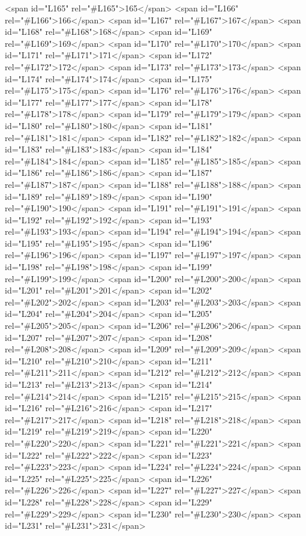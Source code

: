 <span id="L165" rel="#L165">165</span>
<span id="L166" rel="#L166">166</span>
<span id="L167" rel="#L167">167</span>
<span id="L168" rel="#L168">168</span>
<span id="L169" rel="#L169">169</span>
<span id="L170" rel="#L170">170</span>
<span id="L171" rel="#L171">171</span>
<span id="L172" rel="#L172">172</span>
<span id="L173" rel="#L173">173</span>
<span id="L174" rel="#L174">174</span>
<span id="L175" rel="#L175">175</span>
<span id="L176" rel="#L176">176</span>
<span id="L177" rel="#L177">177</span>
<span id="L178" rel="#L178">178</span>
<span id="L179" rel="#L179">179</span>
<span id="L180" rel="#L180">180</span>
<span id="L181" rel="#L181">181</span>
<span id="L182" rel="#L182">182</span>
<span id="L183" rel="#L183">183</span>
<span id="L184" rel="#L184">184</span>
<span id="L185" rel="#L185">185</span>
<span id="L186" rel="#L186">186</span>
<span id="L187" rel="#L187">187</span>
<span id="L188" rel="#L188">188</span>
<span id="L189" rel="#L189">189</span>
<span id="L190" rel="#L190">190</span>
<span id="L191" rel="#L191">191</span>
<span id="L192" rel="#L192">192</span>
<span id="L193" rel="#L193">193</span>
<span id="L194" rel="#L194">194</span>
<span id="L195" rel="#L195">195</span>
<span id="L196" rel="#L196">196</span>
<span id="L197" rel="#L197">197</span>
<span id="L198" rel="#L198">198</span>
<span id="L199" rel="#L199">199</span>
<span id="L200" rel="#L200">200</span>
<span id="L201" rel="#L201">201</span>
<span id="L202" rel="#L202">202</span>
<span id="L203" rel="#L203">203</span>
<span id="L204" rel="#L204">204</span>
<span id="L205" rel="#L205">205</span>
<span id="L206" rel="#L206">206</span>
<span id="L207" rel="#L207">207</span>
<span id="L208" rel="#L208">208</span>
<span id="L209" rel="#L209">209</span>
<span id="L210" rel="#L210">210</span>
<span id="L211" rel="#L211">211</span>
<span id="L212" rel="#L212">212</span>
<span id="L213" rel="#L213">213</span>
<span id="L214" rel="#L214">214</span>
<span id="L215" rel="#L215">215</span>
<span id="L216" rel="#L216">216</span>
<span id="L217" rel="#L217">217</span>
<span id="L218" rel="#L218">218</span>
<span id="L219" rel="#L219">219</span>
<span id="L220" rel="#L220">220</span>
<span id="L221" rel="#L221">221</span>
<span id="L222" rel="#L222">222</span>
<span id="L223" rel="#L223">223</span>
<span id="L224" rel="#L224">224</span>
<span id="L225" rel="#L225">225</span>
<span id="L226" rel="#L226">226</span>
<span id="L227" rel="#L227">227</span>
<span id="L228" rel="#L228">228</span>
<span id="L229" rel="#L229">229</span>
<span id="L230" rel="#L230">230</span>
<span id="L231" rel="#L231">231</span>
